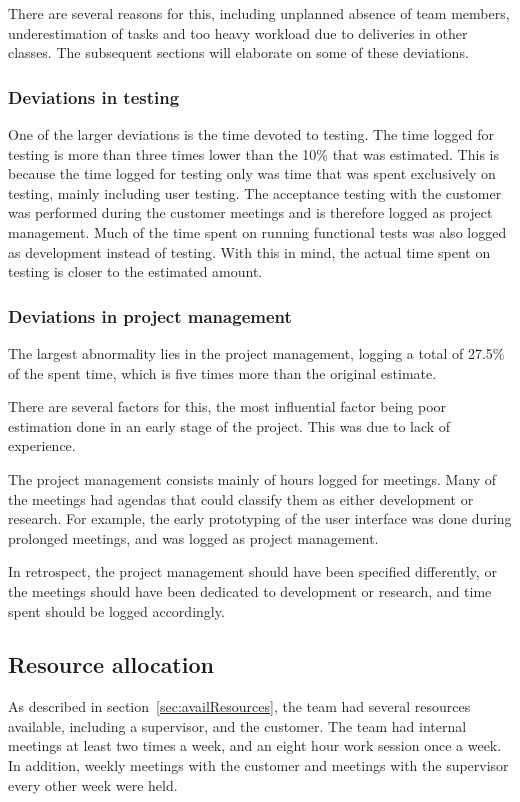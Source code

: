 There are several reasons for this, including unplanned absence of team members, underestimation of tasks and too heavy workload due to deliveries in other classes. The subsequent sections will elaborate on some of these deviations.

\subsubsection{Deviations in testing}
One of the larger deviations is the time devoted to testing. The time logged for testing is more than three times lower than the 10\% that was estimated. This is because the time logged for testing only was time that was spent exclusively on testing, mainly including user testing. The acceptance testing with the customer was performed during the customer meetings and is therefore logged as project management. Much of the time spent on running functional tests was also logged as development instead of testing. With this in mind, the actual time spent on testing is closer to the estimated amount.

\subsubsection{Deviations in project management}
The largest abnormality lies in the project management, logging a total of 27.5\% of the spent time, which is five times more than the original estimate. 

There are several factors for this, the most influential factor being poor estimation done in an early stage of the project. This was due to lack of experience. 

The project management consists mainly of hours logged for meetings. Many of the meetings had agendas that could classify them as either development or research. For example, the early prototyping of the user interface was done during prolonged meetings, and was logged as project management. 

In retrospect, the project management should have been specified differently, or the meetings should have been dedicated to development or research, and time spent should be logged accordingly.

\subsection{Resource allocation}
As described in section~\ref{sec:availResources}, the team had several resources available, including a supervisor, and the customer. The team had internal meetings at least two times a week, and an eight hour work session once a week. In addition, weekly meetings with the customer and meetings with the supervisor every other week were held.

